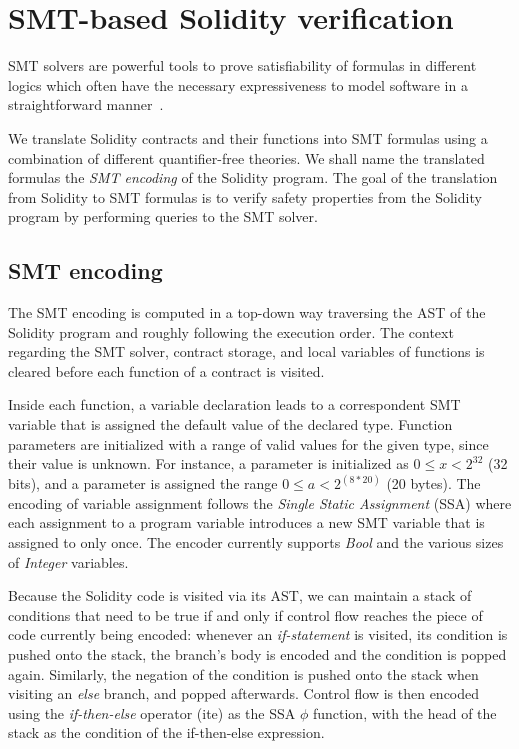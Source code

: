 \section{SMT-based Solidity verification}
\label{section:smt}

SMT solvers are powerful tools to prove satisfiability of formulas in different
logics which often have the necessary expressiveness to model software in a
straightforward manner~\cite{Komuravelli13,Alt17,Donaldson11,Beyer11}.

We translate Solidity contracts and their functions into SMT formulas using a
combination of different quantifier-free theories.
%
We shall name the translated formulas the \emph{SMT encoding} of the Solidity
program.
%
The goal of the translation from Solidity to SMT formulas is to verify safety
properties from the Solidity program by performing queries to the SMT solver.


\subsection{SMT encoding}

The SMT encoding is computed in a top-down way traversing the AST of the
Solidity program and roughly following the execution order.
The context regarding the SMT solver, contract storage, and
local variables of functions is cleared before each function of a contract is
visited.

Inside each function, a variable declaration leads to a correspondent SMT
variable that is assigned the default value of the declared type.
%
Function parameters are initialized with a range of valid values for the given
type, since their value is unknown.  For instance, a parameter 
is initialized as $0 \le x < 2^{32}$ (32 bits), and a parameter  is assigned the range $0 \le a < 2^{(8*20)}$ (20 bytes).
%
The encoding of variable assignment follows the \emph{Single Static Assignment}
(SSA) where each assignment to a program variable introduces a new SMT variable
that is assigned to only once.
%
The encoder currently supports \emph{Bool} and the various sizes of
\emph{Integer} variables.

Because the Solidity code is visited via its AST, we can maintain a stack of
conditions that need to be true if and only if control flow
reaches the piece of code currently being encoded: whenever an
\emph{if-statement} is visited, its condition is pushed onto the stack, the
branch's body is encoded and the condition is popped again.
%
Similarly, the negation of the condition is pushed onto the stack when visiting
an \emph{else} branch, and popped afterwards.
%
Control flow is then encoded using the \emph{if-then-else} operator (ite) as
the SSA $\phi$ function, with the head of the stack as the condition of the
if-then-else expression.

